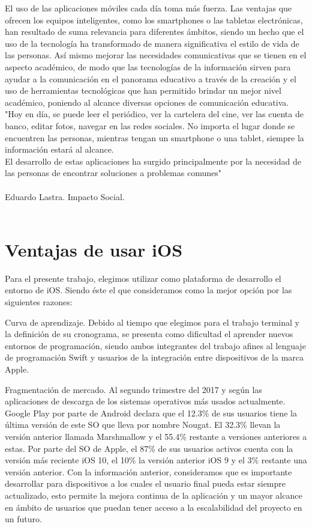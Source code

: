 	El uso de las aplicaciones móviles cada día toma más fuerza. Las ventajas que ofrecen los equipos inteligentes, como los smartphones o las tabletas electrónicas, han resultado de suma relevancia para diferentes ámbitos, siendo un hecho que el uso de la tecnología ha transformado de manera significativa el estilo de vida de las personas.
	Así mismo mejorar las necesidades comunicativas que se tienen en el aspecto académico, de modo que las tecnologías de la información sirven para ayudar a la comunicación en el panorama educativo a través de la creación y el uso de herramientas tecnológicas que han permitido brindar un mejor nivel académico, poniendo al alcance diversas opciones de comunicación educativa.\\
	
	"Hoy en día, se puede leer el periódico, ver la cartelera del cine, ver las cuenta de banco, editar fotos, navegar en las redes sociales. No importa el lugar donde se encuentren las personas, mientras tengan un smartphone o una tablet, siempre la información estará al alcance.\\
	El desarrollo de estas aplicaciones ha surgido principalmente por la necesidad de las personas de encontrar soluciones a problemas comunes"
	\\ \\
	Eduardo Lastra. Impacto Social.
	\\ \\
	\section{Ventajas de usar iOS}
	Para el presente trabajo, elegimos utilizar como plataforma de desarrollo el entorno de iOS. Siendo éste el que consideramos como la mejor opción por las siguientes razones:
	
	Curva de aprendizaje.
	Debido al tiempo que elegimos para el trabajo terminal y la definición de su cronograma, se presenta como dificultad el aprender nuevos entornos de programación, siendo ambos integrantes del trabajo afines al lenguaje de programación Swift y usuarios de la integración entre dispositivos de la marca Apple.
	
	Fragmentación de mercado.
	Al segundo trimestre del 2017 y según las aplicaciones de descarga de los sistemas operativos más usados actualmente. Google Play por parte de Android declara que el 12.3\% de sus usuarios tiene la última versión de este SO que lleva por nombre Nougat. El 32.3\% llevan la versión anterior llamada Marshmallow y el 55.4\% restante a versiones anteriores a estas. Por parte del SO de Apple, el 87\% de sus usuarios activos cuenta con la versión más reciente iOS 10, el 10\% la versión anterior iOS 9 y el 3\% restante una versión anterior.
	Con la información anterior, consideramos que es importante desarrollar para dispositivos a los cuales el usuario final pueda estar siempre actualizado, esto permite la mejora continua de la aplicación y un mayor alcance en ámbito de usuarios que puedan tener acceso a la escalabilidad del proyecto en un futuro.
